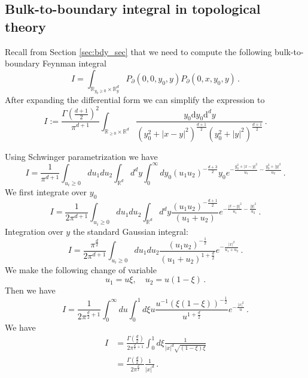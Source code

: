 \documentclass[11pt]{article}
\newcommand{\R}{\mathbb{R}}
\newcommand{\ddr}{\mathrm{d}}
\numberwithin{equation}{section}
\begin{document}
 \subsection{Bulk-to-boundary integral in topological theory}
 \label{sec:top_Feyn_int}


 Recall from Section \ref{sec:bdy_sec} that we need to compute the following bulk-to-boundary Feynman integral
   \begin{equation}
 	I = \int_{\R_{y_0\geq 0}\times \R^d_y}P_{\partial}(0,0,y_0,y)P_{\partial}(0,x,y_0,y)\,.
 \end{equation}
 After expanding the differential form we can simplify the expression to 
 \begin{equation}
 I := 	\frac{\Gamma(\frac{d+1}{2})^2}{\pi^{d+1}}\int_{\R_{\geq0}\times\R^{d}}\frac{y_0\ddr y_0\ddr^dy}{(y_0^2+|x-y|^2)^{\frac{d+1}{2}}(y_0^2 + |y|^2)^{\frac{d+1}{2}}}\,.
 \end{equation}
 
 Using Schwinger parametrization we have
 \begin{equation}
 	I = \frac{1}{\pi^{d+1}} \int_{u_i\geq 0}du_1du_2\int_{\R^{d}}d^{d}y\int_0^{\infty}dy_0(u_1u_2)^{-\frac{d+3}{2}}y_0e^{-\frac{y_0^2+|x-y|^2}{u_1} - \frac{y_0^2 + |y|^2}{u_2}}\,.
 \end{equation}
 We first integrate over $y_0$
\begin{equation}
	I = \frac{1}{2\pi^{d+1}}\int_{u_i\geq 0}du_1du_2\int_{\R^{d}}d^{d}y\frac{(u_1u_2)^{-\frac{d+1}{2}}}{(u_1+u_2)}e^{-\frac{|x-y|^2}{u_1} - \frac{|y|^2}{u_2}}\,.
\end{equation}
Integration over $y$ the standard Gaussian integral:
\begin{equation}
	I = \frac{\pi^{\frac{d}{2}}}{2\pi^{d+1}}\int_{u_i\geq 0}du_1du_2\frac{(u_1u_2)^{-\frac{1}{2}}}{(u_1+u_2)^{1+ \frac{d}{2}}}e^{-\frac{|x|^2}{u_1+u_2}}\,.
\end{equation}
We make the following change of variable
\begin{equation}
	u_1 = u\xi,\quad u_2  = u(1-\xi)\,.
\end{equation}
Then we have 
\begin{equation}
	I = \frac{1}{2\pi^{\frac{d}{2}+1}}\int_{0}^{\infty}du\int_0^{1}d\xi u\frac{u^{-1}(\xi(1-\xi))^{-\frac{1}{2}}}{u^{1+ \frac{d}{2}}}e^{-\frac{|x|^2}{u}}\,.
\end{equation}
We have
\begin{equation}
	\begin{aligned}
		I &= \frac{\Gamma(\frac{d}{2})}{2\pi^{\frac{d}{2}+1}}\int_{0}^{1}d\xi \frac{1}{|x|^d\sqrt{(1-\xi)\xi}}\\
		&= \frac{\Gamma(\frac{d}{2})}{2\pi^{\frac{d}{2}}}\frac{1}{|x|^d}\,.
	\end{aligned}
\end{equation}
\end{document}

